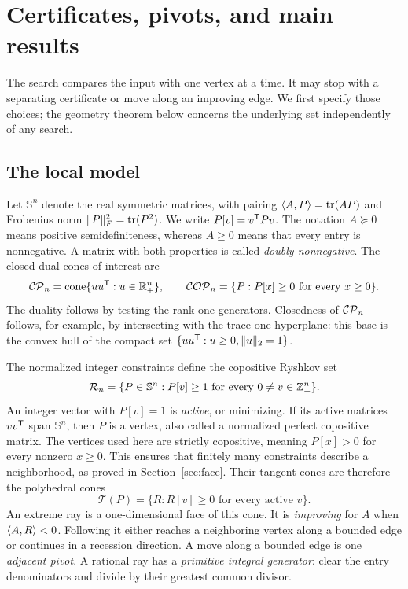 \section{Certificates, pivots, and main results}\label{sec:model}
The search compares the input with one vertex at a time. It may stop with a separating certificate or move along an improving edge. We first specify those choices; the geometry theorem below concerns the underlying set independently of any search.

\subsection{The local model}
Let $\mathbb S^n$ denote the real symmetric matrices, with pairing $\langle A,P\rangle=\operatorname{tr}(AP)$ and Frobenius norm $\lVert P\rVert_F^2=\operatorname{tr}(P^2)$. We write $P[v]=v^{\mathsf T} Pv$. The notation $A\succeq0$ means positive semidefiniteness, whereas $A\ge0$ means that every entry is nonnegative. A matrix with both properties is called \emph{doubly nonnegative}. The closed dual cones of interest are
\[
 \mathcal{CP}_n=\operatorname{cone}\{uu^{\mathsf T}:u\in\mathbb R_+^n\},\qquad
 \mathcal{COP}_n=\{P:P[x]\ge0\text{ for every }x\ge0\}.
\]
The duality follows by testing the rank-one generators. Closedness of $\mathcal{CP}_n$ follows, for example, by intersecting with the trace-one hyperplane: this base is the convex hull of the compact set $\{uu^{\mathsf T}:u\ge0,\lVert u\rVert_2=1\}$.

The normalized integer constraints define the copositive Ryshkov set
\begin{equation}\label{eq:ryshkov}
 \mathcal R_n=\{P\in\mathbb S^n:P[v]\ge1\text{ for every }0\ne v\in\mathbb Z_+^n\}.
\end{equation}
An integer vector with $P[v]=1$ is \emph{active}, or minimizing. If its active matrices $vv^{\mathsf T}$ span $\mathbb S^n$, then $P$ is a vertex, also called a normalized perfect copositive matrix. The vertices used here are strictly copositive, meaning $P[x]>0$ for every nonzero $x\ge0$. This ensures that finitely many constraints describe a neighborhood, as proved in Section~\ref{sec:face}. Their tangent cones are therefore the polyhedral cones
\begin{equation}\label{eq:tangent}
 \mathcal T(P)=\{R:R[v]\ge0\text{ for every active }v\}.
\end{equation}
An extreme ray is a one-dimensional face of this cone. It is \emph{improving} for $A$ when $\langle A,R\rangle<0$. Following it either reaches a neighboring vertex along a bounded edge or continues in a recession direction. A move along a bounded edge is one \emph{adjacent pivot}. A rational ray has a \emph{primitive integral generator}: clear the entry denominators and divide by their greatest common divisor.

